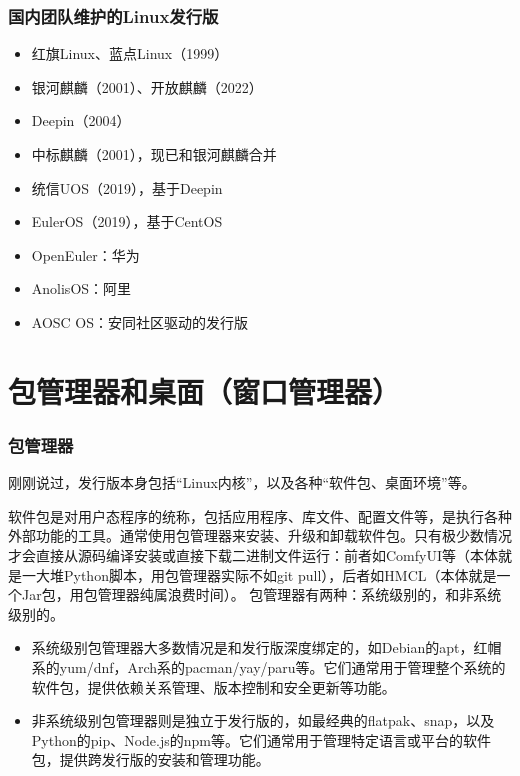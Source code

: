 \documentclass[aspectratio=1610]{ctexbeamer}
\begin{document}
\begin{frame}
  \frametitle{国内团队维护的Linux发行版}
  \begin{itemize}
    \item 红旗Linux、蓝点Linux（1999）
    \item 银河麒麟（2001）、开放麒麟（2022）
    \item Deepin（2004）
    \item 中标麒麟（2001），现已和银河麒麟合并
    \item 统信UOS（2019），基于Deepin
    \item EulerOS（2019），基于CentOS
    \item OpenEuler：华为
    \item AnolisOS：阿里
    \item AOSC OS：安同社区驱动的发行版
  \end{itemize}
\end{frame}

\section{包管理器和桌面（窗口管理器）}

\begin{frame}
  \frametitle{包管理器}
  刚刚说过，发行版本身包括“Linux内核”，以及各种“软件包、桌面环境”等。
  
  软件包是对用户态程序的统称，包括应用程序、库文件、配置文件等，是执行各种外部功能的工具。通常使用包管理器来安装、升级和卸载软件包。只有极少数情况才会直接从源码编译安装或直接下载二进制文件运行：前者如ComfyUI等（本体就是一大堆Python脚本，用包管理器实际不如git pull），后者如HMCL（本体就是一个Jar包，用包管理器纯属浪费时间）。
  包管理器有两种：系统级别的，和非系统级别的。

  \begin{itemize}
    \item 系统级别包管理器大多数情况是和发行版深度绑定的，如Debian的apt，红帽系的yum/dnf，Arch系的pacman/yay/paru等。它们通常用于管理整个系统的软件包，提供依赖关系管理、版本控制和安全更新等功能。
    \item 非系统级别包管理器则是独立于发行版的，如最经典的flatpak、snap，以及Python的pip、Node.js的npm等。它们通常用于管理特定语言或平台的软件包，提供跨发行版的安装和管理功能。
  \end{itemize}

\end{frame}
\end{document}
